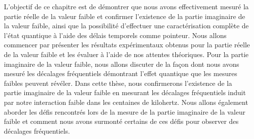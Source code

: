 \begin{onehalfspace}
    L'objectif de ce chapitre est de démontrer que nous avons
    effectivement mesuré la partie réelle de la valeur faible et 
    confirmer l'existence de la partie imaginaire de la valeur faible,
    ainsi que la possibilité d'effectuer une
    caractérisation complète de l'état quantique à l'aide des délais 
    temporels comme pointeur. Nous allons commencer 
    par présenter les résultats expérimentaux
    obtenus pour la partie réelle de la valeur faible et les
    évaluer à l'aide de nos attentes théoriques.
    Pour la partie imaginaire de la
    valeur faible, nous allons discuter de la façon dont nous avons
    mesuré les décalages fréquentiels démontrant 
    l'effet quantique que les mesures faibles peuvent révéler. Dans cette
    thèse, nous confirmerons l'existence de la partie imaginaire
    de la valeur faible en mesurant les décalages fréquentiels
    induit par notre interaction faible dans les centaines de
    kilohertz. Nous allons également aborder les défis
    rencontrés lors de la mesure de la partie imaginaire de la
    valeur faible et comment nous avons surmonté certains de ces défis 
    pour observer des décalages fréquentiels.
\end{onehalfspace}